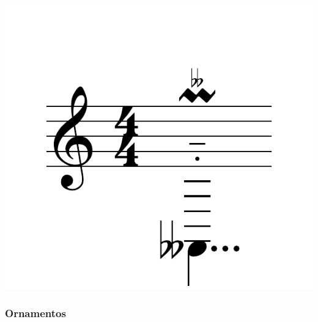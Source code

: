 \documentclass{article}
\begin{document}
\includegraphics[scale=0.5]{figures_tests/pdf/skern/notesFullAdds.pdf}

\subsubsection{Ornamentos}
\end{document}
